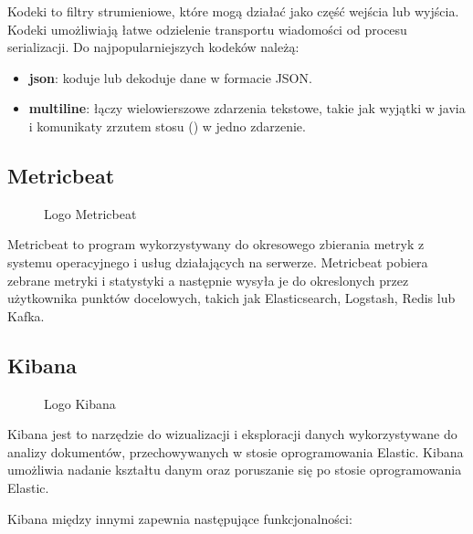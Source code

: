 Kodeki to filtry strumieniowe, które mogą działać jako część wejścia lub wyjścia. Kodeki umożliwiają łatwe odzielenie transportu wiadomości od procesu serializacji. Do najpopularniejszych kodeków należą:

\begin{itemize}
    \item \textbf{json}: koduje lub dekoduje dane w formacie JSON\cite{logstashManualHowItWorks}.
    \item \textbf{multiline}: łączy wielowierszowe zdarzenia tekstowe, takie jak wyjątki w javia i komunikaty zrzutem stosu () w jedno zdarzenie\cite{logstashManualHowItWorks}.
\end{itemize}

\subsection{Metricbeat}


\begin{figure}[!htbp]
    \centering
    
    \caption{Logo Metricbeat\cite{metricbeatLogo}}
    \label{fig:enter-label}
\end{figure}

Metricbeat to program wykorzystywany do okresowego zbierania metryk z systemu operacyjnego i usług działających na serwerze. Metricbeat pobiera zebrane metryki i statystyki a następnie wysyła je do okreslonych przez użytkownika punktów docelowych, takich jak Elasticsearch, Logstash, Redis lub Kafka\cite{metricbeatOverview}.


\subsection{Kibana}

\begin{figure}[!htbp]
    \centering
    
    \caption{Logo Kibana\cite{kibanaLogo}}
    \label{fig:enter-label}
\end{figure}

Kibana jest to narzędzie do wizualizacji i eksploracji danych wykorzystywane do analizy dokumentów, przechowywanych w stosie oprogramowania Elastic. Kibana umożliwia nadanie kształtu danym oraz poruszanie się po stosie oprogramowania Elastic\cite{kibanaOverview}. 

Kibana między innymi zapewnia następujące funkcjonalności:

